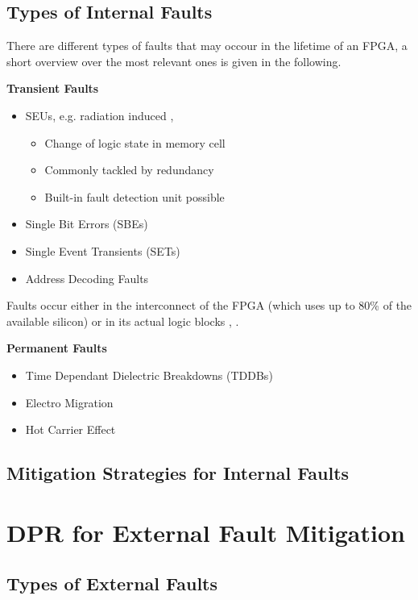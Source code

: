 \documentclass[10pt, journal]{IEEEtran}
\begin{document}
\subsection{Types of Internal Faults}
There are different types of faults that may occour in the lifetime of an FPGA, a short overview over the most relevant ones is given in the following.
\par
\textbf{Transient Faults}
\begin{itemize}
    \item \glspl{SEU}, e.g. radiation induced \cite{alkady_fault-tolerant_2014}, \cite{lee_fault-tolerant_2017}
    \begin{itemize}
    \item Change of logic state in memory cell
    \item Commonly tackled by redundancy
    \item Built-in fault detection unit possible
    \end{itemize}
    \item Single Bit Errors (SBEs)
    \item Single Event Transients (SETs)
    \item Address Decoding Faults
\end{itemize}

Faults occur either in the interconnect of the \gls{FPGA} (which uses up to 80\% of the available silicon) or in its actual logic blocks \cite{alkady_fault-tolerant_2014}, \cite{jing_huang_routability_2004}.
\par
\textbf{Permanent Faults}
\begin{itemize}
    \item Time Dependant Dielectric Breakdowns (TDDBs)
    \item Electro Migration
    \item Hot Carrier Effect
\end{itemize}
\subsection{Mitigation Strategies for Internal Faults}

\section{\gls{DPR} for External Fault Mitigation}\label{ExternalFaults}
\subsection{Types of External Faults}
\end{document}
